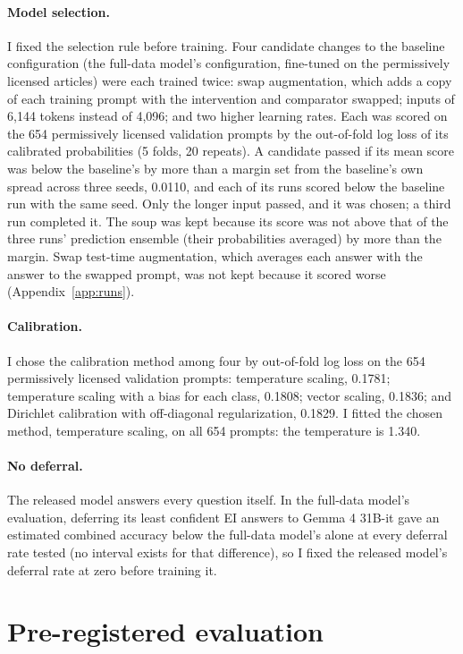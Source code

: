 \documentclass[11pt,letterpaper]{article}
\begin{document}
\paragraph{Model selection.} I fixed the selection rule before training. Four candidate changes to the baseline configuration (the full-data model's configuration, fine-tuned on the permissively licensed articles) were each trained twice: swap augmentation, which adds a copy of each training prompt with the intervention and comparator swapped; inputs of 6,144 tokens instead of 4,096; and two higher learning rates. Each was scored on the 654 permissively licensed validation prompts by the out-of-fold log loss of its calibrated probabilities (5 folds, 20 repeats). A candidate passed if its mean score was below the baseline's by more than a margin set from the baseline's own spread across three seeds, 0.0110, and each of its runs scored below the baseline run with the same seed. Only the longer input passed, and it was chosen; a third run completed it. The soup was kept because its score was not above that of the three runs' prediction ensemble (their probabilities averaged) by more than the margin. Swap test-time augmentation, which averages each answer with the answer to the swapped prompt, was not kept because it scored worse (Appendix~\ref{app:runs}).

\paragraph{Calibration.} I chose the calibration method among four by out-of-fold log loss on the 654 permissively licensed validation prompts: temperature scaling, 0.1781; temperature scaling with a bias for each class, 0.1808; vector scaling, 0.1836; and Dirichlet calibration with off-diagonal regularization, 0.1829. I fitted the chosen method, temperature scaling, on all 654 prompts: the temperature is 1.340.

\paragraph{No deferral.} The released model answers every question itself. In the full-data model's evaluation, deferring its least confident EI answers to Gemma 4 31B-it gave an estimated combined accuracy below the full-data model's alone at every deferral rate tested (no interval exists for that difference), so I fixed the released model's deferral rate at zero before training it.

\section{Pre-registered evaluation}
\label{sec:tests}
\end{document}
